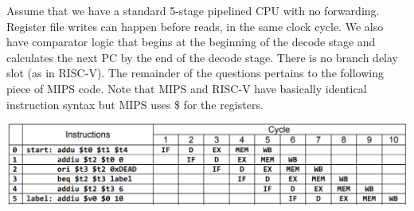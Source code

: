 \begin{blocksection}
\question
Assume that we have a standard 5-stage pipelined CPU with no forwarding. Register file writes can happen before reads, in the same clock cycle. We also have comparator logic that begins at the beginning of the decode stage and calculates the next PC by the end of the decode stage. There is no branch delay slot (as in RISC-V). The remainder of the questions pertains to the following piece of MIPS code. Note that MIPS and RISC-V have basically identical instruction syntax but MIPS uses \$ for the registers.

\includegraphics[width=1.4\textwidth]{images/midterm2/hazards.png}

\end{blocksection}